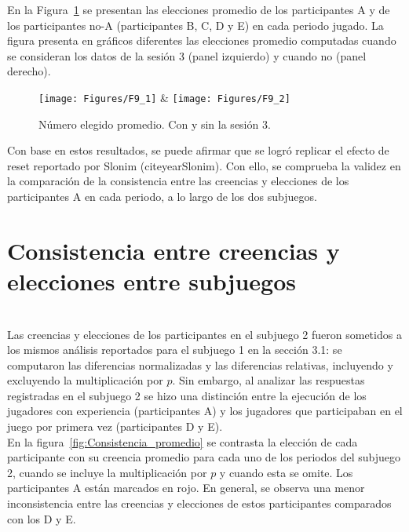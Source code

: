 En la Figura~\ref{fig:ParticipantesA_promedio} se presentan las elecciones promedio de los participantes A y de los participantes no-A (participantes B, C, D y E) en cada periodo jugado. La figura presenta en gráficos diferentes las elecciones promedio computadas cuando se consideran los datos de la sesión 3 (panel izquierdo) y cuando no (panel derecho).\\
  
\begin{figure}[hp]
\centering
\texttt{[image: Figures/F9\_1]} & \texttt{[image: Figures/F9\_2]} 
\decoRule
\caption[Evaluación de las Diferencias Relativas entre creencias y elecciones en el Subjuego 1 sin la multiplicación por p (Factor de Bayes)]{Número elegido promedio. Con y sin la sesión 3.}
\label{fig:ParticipantesA_promedio}
\end{figure}  

Con base en estos resultados, se puede afirmar que se logró replicar el efecto de reset reportado por Slonim (citeyear{Slonim}). Con ello, se comprueba la validez en la comparación de la consistencia entre las creencias y elecciones de los participantes A en cada periodo, a lo largo de los dos subjuegos.\\

\section{Consistencia entre creencias y elecciones entre subjuegos}\\

Las creencias y elecciones de los participantes en el subjuego 2 fueron sometidos a los mismos análisis reportados para el subjuego 1 en la sección 3.1: se computaron las diferencias normalizadas y las diferencias relativas, incluyendo y excluyendo la multiplicación por $p$. Sin embargo, al analizar las respuestas registradas en el subjuego 2 se hizo una distinción entre la ejecución de los jugadores con experiencia (participantes A) y los jugadores que participaban en el juego por primera vez (participantes D y E).\\

En la figura~\ref{fig:Consistencia_promedio} se contrasta la elección de cada participante con su creencia promedio para cada uno de los periodos del subjuego 2, cuando se incluye la multiplicación por $p$ y cuando esta se omite. Los participantes A están marcados en rojo. En general, se observa una menor inconsistencia entre las creencias y elecciones de estos participantes comparados con los D y E.\\

